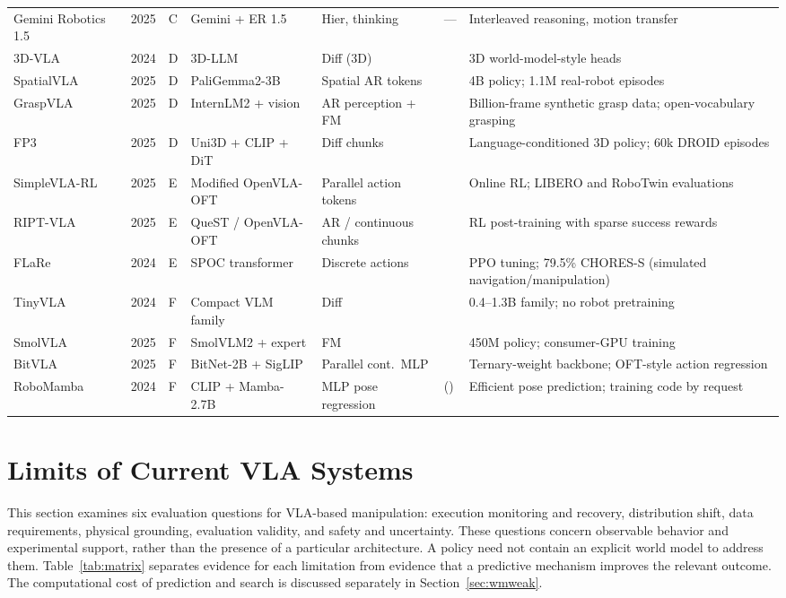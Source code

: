 \documentclass{ieeeaccess}
\newcommand{\cmark}{\ding{51}}
\begin{document}
\begin{table}[!t]
\begin{tabular}{p{2.5cm}p{0.7cm}p{0.7cm}p{2.2cm}p{2.0cm}p{0.7cm}p{5.5cm}}
Gemini Robotics 1.5~\cite{gemini15} & 2025 & C & Gemini + ER 1.5 & Hier, thinking & --- & Interleaved reasoning, motion transfer \\
3D-VLA~\cite{threedvla} & 2024 & D & 3D-LLM & Diff (3D) & \cmark & 3D world-model-style heads \\
SpatialVLA~\cite{spatialvla} & 2025 & D & PaliGemma2-3B & Spatial AR tokens & \cmark & 4B policy; 1.1M real-robot episodes \\
GraspVLA~\cite{graspvla} & 2025 & D & InternLM2 + vision & AR perception + FM & \cmark & Billion-frame synthetic grasp data; open-vocabulary grasping \\
FP3~\cite{fp3} & 2025 & D & Uni3D + CLIP + DiT & Diff chunks & \cmark & Language-conditioned 3D policy; 60k DROID episodes \\
SimpleVLA-RL~\cite{simplevlarl} & 2025 & E & Modified OpenVLA-OFT & Parallel action tokens & \cmark & Online RL; LIBERO and RoboTwin evaluations \\
RIPT-VLA~\cite{riptvla} & 2025 & E & QueST / OpenVLA-OFT & AR / continuous chunks & \cmark & RL post-training with sparse success rewards \\
FLaRe~\cite{flarerl} & 2024 & E & SPOC transformer & Discrete actions & \cmark & PPO tuning; 79.5\% CHORES-S (simulated navigation/manipulation) \\
TinyVLA~\cite{tinyvla} & 2024 & F & Compact VLM family & Diff & \cmark & 0.4--1.3B family; no robot pretraining \\
SmolVLA~\cite{smolvla} & 2025 & F & SmolVLM2 + expert & FM & \cmark & 450M policy; consumer-GPU training \\
BitVLA~\cite{bitvla} & 2025 & F & BitNet-2B + SigLIP & Parallel cont.\ MLP & \cmark & Ternary-weight backbone; OFT-style action regression \\
RoboMamba~\cite{robomamba} & 2024 & F & CLIP + Mamba-2.7B & MLP pose regression & (\cmark) & Efficient pose prediction; training code by request \\
\bottomrule
\end{tabular}
\end{table}

\section{Limits of Current VLA Systems}
\label{sec:limitations}

\textcolor[RGB]{104,48,148}{This section examines six evaluation questions for VLA-based manipulation: execution monitoring and recovery, distribution shift, data requirements, physical grounding, evaluation validity, and safety and uncertainty. These questions concern observable behavior and experimental support, rather than the presence of a particular architecture. A policy need not contain an explicit world model to address them. Table~\ref{tab:matrix} separates evidence for each limitation from evidence that a predictive mechanism improves the relevant outcome. The computational cost of prediction and search is discussed separately in Section~\ref{sec:wmweak}.}
\end{document}
